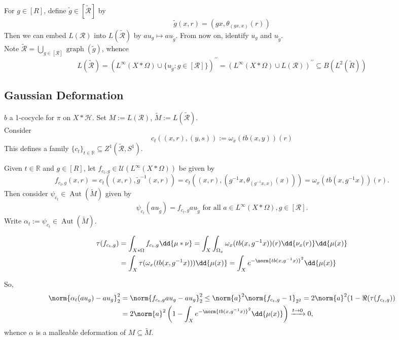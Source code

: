 \documentclass[12pt,letterpaper]{article}
\newcommand{\sub}{\subseteq}
\newcommand{\lr}[1]{\left(#1\right)}
\newcommand{\R}{\mathbb{R}\xspace}
\renewcommand{\H}{\mathcal{H}}
\DeclareMathOperator{\graph}{graph}
\DeclareMathOperator{\Aut}{Aut}
\theoremstyle{definition}
\theoremstyle{plain}
\theoremstyle{remark}
\begin{document}
For $ g\in [R] $, define $ \widetilde{g}\in [\widetilde{\mathcal{R}}] $ by
\[
    \widetilde{g}(x,r) = (gx, \theta_{(gx, x)}(r))
\]
Then we can embed $ L(\mathcal{R}) $ into $ L(\widetilde{\mathcal{R}}) $ by $ au_{g}\mapsto au_{\widetilde{g}} $. From now on, identify $ u_{g} $ and $ u_{\widetilde{g}} $.\\

Note $ \widetilde{\mathcal{R}} = \bigcup_{g\in[\mathcal{R}]}\graph(\widetilde{g})$, whence
\[
    L(\widetilde{\mathcal{R}}) = (L^{\infty}(X\ast \Omega)\cup \{u_{\widetilde{g}}: g\in [\mathcal{R}]\})^{\prime\prime} =  (L^{\infty}(X\ast \Omega)\cup L(\mathcal{R}))^{\prime\prime} \sub B(L^{2}(\widetilde{R}))
\]

\subsection{Gaussian Deformation}

$ b $ a 1-cocycle for $ \pi $ on $ X\ast \H $. Set $ M:=L(\mathcal{R}) $, $ \widetilde{M}:=L(\widetilde{\mathcal{R}}) $.\\

Consider
\[
    c_{t}((x,r),(y,s)) := \omega_{x}(tb(x,y))(r)
\]
This defines a family $ \{c_{t}\}_{t\in\R}\sub Z^{1}(\widetilde{\mathcal{R}},S^{1}) $.

Given $ t\in \R $ and $ g\in [R] $, let $ f_{c_t,g}\in \mathcal{U}(L^{\infty}(X\ast \Omega)) $ be given by
\[
    f_{c_t,g}(x,r) = c_{t}((x,r),\widetilde{g}^{-1}(x,r)) = c_{t}((x,r),(g^{-1}x,\theta_{(g^{-1}x,x)}(x))) = \omega_{x}(tb(x,g^{-1}x))(r).
\]
 Then consider $ \psi_{c_t}\in \Aut(\widetilde{M})$ given by 
 \[
     \psi_{c_{t}}(au_{\widetilde{g}}) = f_{c_t,g}au_{\widetilde{g}} \text{ for all } a\in L^{\infty}(X\ast \Omega), g\in [\mathcal{R}].
 \]
Write $ \alpha_{t}:=\psi_{c_{t}}\in \Aut(\widetilde{M}) $. 


\begin{align*}
    \tau(f_{c_{t},g}) &= \int_{X\ast \Omega}f_{c_{t},g}\dd{\mu\ast \nu} = \int_{X}\int_{\Omega_{x}}\omega_{x}(tb(x,g^{-1}x))(r)\dd{\nu_{x}(r)}\dd{\mu(x)} \\
    &=\int_{X} \tau(\omega_{x}(tb(x,g^{-1}x)))\dd{\mu(x)} = \int_{X} e^{-\norm{tb(x,g^{-1}x)}^{2}}\dd{\mu(x)} 
\end{align*}

So,
\begin{align*}
    \norm{\alpha_{t}(au_{g})-au_{g}}_{2}^{2}& = \norm{f_{c_{t},g}au_{g}-au_{g}}_{2}^{2}\leq \norm{a}^{2} \norm{f_{c_{t},g}-1}_{2^{2}} = 2\norm{a}^{2}(1-\Re(\tau(f_{c_{t},g})) \\
    &= 2\norm{a}^{2}\lr{1-\int_{X} e^{-\norm{tb(x,g^{-1}x)}^{2}}\dd{\mu(x)}}\xrightarrow{t\to0}0,
\end{align*}
whence $ \alpha $ is a malleable deformation of $ M\sub \widetilde{M} $.
\end{document}
